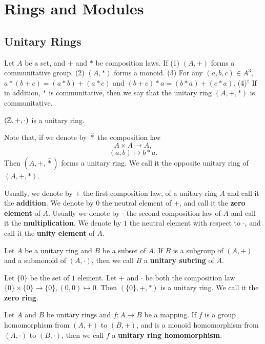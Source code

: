 \documentclass{book}
\numberwithin{equation}{section}
\begin{document}
\chapter{Rings and Modules}
\section{Unitary Rings}
\begin{definitionenv}
    Let $A$ be a set, and $+$ and $*$ be composition laws. If 
    \newline
    (1) $(A,+)$ forms a communitative group.
    \newline
    (2) $(A,*)$ forms a monoid.
    \newline
    (3) For any $(a,b,c)\in A^3$, $a*(b+c)=(a*b)+(a*c)$ and $(b+c)*a=(b*a)+(c*a)$.
    \newline
    (4)$^\dagger$ If in addition, $*$ is communitative, then we say that the unitary ring $(A,+,*)$ is communitative.
\end{definitionenv}
\begin{exampleenv}
    $(\mathbb{Z},+,\cdot)$ is a unitary ring.
\end{exampleenv}
Note that, if we denote by $\hat{*}$ the composition law 
$$A\times A\longrightarrow A,$$
$$(a,b)\longmapsto b*a.$$
Then $(A,+,\hat{*})$ forms a unitary ring. We call it the opposite unitary ring of $(A,+,*)$.
\begin{notationenv}
    Usually, we denote by $+$ the first composition law, of a unitary ring $A$ and call it the \textbf{addition}. We denote by $0$ the neutral element of $+$, and call it the \textbf{zero element} of $A$. Usually we denote by $\cdot$ the second composition law of $A$ and call it the \textbf{multiplication}. We denote by $1$ the neutral element with respect to $\cdot$, and call it the \textbf{unity element} of $A$.
\end{notationenv}
\begin{definitionenv}
    Let $A$ be a unitary ring and $B$ be a subset of $A$. If $B$ is a subgroup of $(A,+)$ and a submonoid of $(A,\cdot)$, then we call $B$ a \textbf{unitary subring} of $A$.
\end{definitionenv}
\begin{exampleenv}
    Let $\{0\}$ be the set of $1$ element. Let $+$ and $\cdot$ be both the composition law $\{0\}\times\{0\}\rightarrow\{0\},(0,0)\mapsto0$. Then $(\{0\},+,*)$ is a unitary ring. We call it the \textbf{zero ring}.
\end{exampleenv}
\begin{definitionenv}
    Let $A$ and $B$ be unitary rings and $f:A\rightarrow B$ be a mapping. If $f$ is a group homomorphism from $(A,+)$ to $(B,+)$, and is a monoid homomorphism from $(A,\cdot)$ to $(B,\cdot)$, then we call $f$ a \textbf{unitary ring homomorphism}. 
\end{definitionenv}
\end{document}
